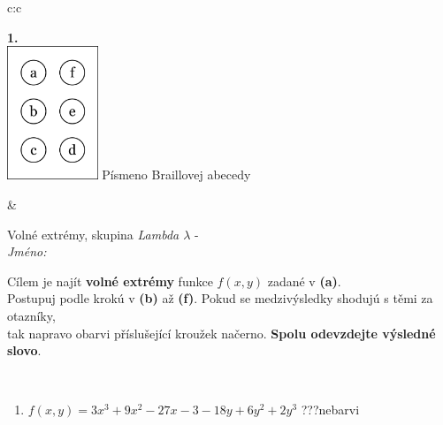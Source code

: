 \documentclass[10pt]{report}
\begin{document}
\begin{tabular}{c:c}
\begin{minipage}[c][104.5mm][t]{0.5\linewidth}
\begin{center}
\begin{minipage}{0.79\linewidth}
\begin{center}
\begin{varwidth}{\linewidth}
\begin{enumerate}
\end{enumerate}
\end{varwidth}
\end{center}
\end{minipage}
\begin{minipage}{0.20\linewidth}
\begin{center}
{\Huge\bfseries 1.} \\[2mm]
\includegraphics[height=40mm]{../images/braille.png}
{\small Písmeno Braillovej abecedy}
\end{center}
\end{minipage}
\end{center}
\end{minipage}
&
\begin{minipage}[c][104.5mm][t]{0.5\linewidth}
\begin{center}
\vspace{7mm}
{\huge Volné extrémy, skupina \textit{Lambda $\lambda$} -}\\[5mm]
\textit{Jméno:}\phantom{xxxxxxxxxxxxxxxxxxxxxxxxxxxxxxxxxxxxxxxxxxxxxxxxxxxxxxxxxxxxxxxxx}\\[5mm]
\begin{minipage}{0.95\linewidth}
\begin{center}
Cílem je najít \textbf{volné extrémy} funkce $f(x,y)$ zadané v \textbf{(a)}.\\Postupuj podle krokú v \textbf{(b)} až \textbf{(f)}. Pokud se medzivýsledky shodujú s těmi za otazníky,\\tak napravo obarvi příslušející kroužek načerno. \textbf{Spolu odevzdejte výsledné slovo}.
\end{center}
\end{minipage}
\\[1mm]
\begin{minipage}{0.79\linewidth}
\begin{center}
\begin{varwidth}{\linewidth}
\begin{enumerate}
\normalsize
\item $f(x,y)=3x^3+9x^2-27x-3-18y+6y^2+2y^3$\quad \dotfill\; ???\;\dotfill \quad nebarvi

\end{enumerate}
\end{varwidth}
\end{center}
\end{minipage}
\end{center}
\end{minipage}
\end{tabular}
\end{document}
